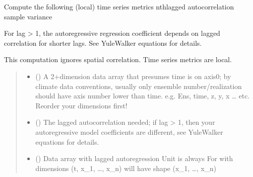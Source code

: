 \documentclass[letterpaper,10pt,english]{sphinxmanual}
\begin{document}
\begin{fulllineitems}
\label{\detokenize{kalman:glomar_gridding.autocorrelation.compute_autocorrelation.compute_lag_ts_metrics_from_da}}
\pysigstartsignatures
\pysiglinewithargsret
{}
{\sphinxparamcomma {}}
{}
\pysigstopsignatures
\sphinxAtStartPar
Compute the following (local) time series metrics
\sphinxhyphen{} nth\sphinxhyphen{}lagged autocorrelation
\sphinxhyphen{} sample variance

\sphinxAtStartPar
For lag \textgreater{} 1, the autoregressive regression coefficient
depends on lagged correlation for shorter lags.
See Yule\sphinxhyphen{}Walker equations for details.

\sphinxAtStartPar
This computation ignores spatial correlation. Time series metrics
are local.
\begin{quote}\begin{description}
\begin{itemize}
\item {}
\sphinxAtStartPar
{} () \textendash{} A 2+\sphinxhyphen{}dimension data array that presumes time is on axis\sphinxhyphen{}0;
by climate data conventions, usually only ensemble number/realization
should have axis number lower than time.
e.g. Ens, time, z, y, x … etc.
Reorder your dimensions first!

\item {}
\sphinxAtStartPar
{} () \textendash{} The lagged autocorrelation needed;
if lag \textgreater{} 1, then your autoregressive model coefficients are
different, see Yule\sphinxhyphen{}Walker equations for details.

\end{itemize}

\sphinxAtStartPar
{}

\sphinxAtStartPar
\begin{itemize}
\item {}
\sphinxAtStartPar
{} () \textendash{} Data array with lagged autoregression
Unit is always 
For  with dimensions (t, x\_1, …, x\_n)
 will have shape (x\_1, …, x\_n)


\end{itemize}
\end{description}
\end{quote}
\end{fulllineitems}
\end{document}
